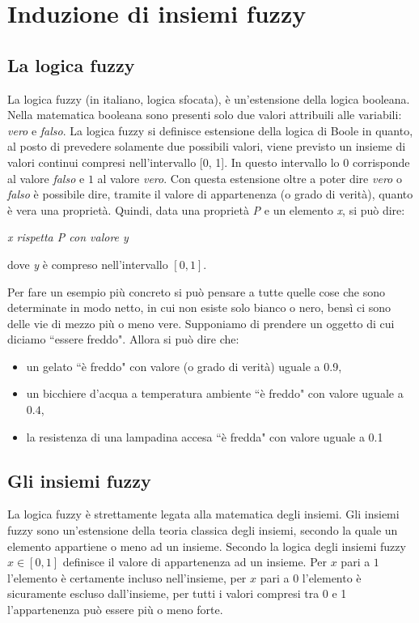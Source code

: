 \documentclass[12pt,italian]{report}
\begin{document}
\chapter{Induzione di insiemi fuzzy}
\label{ch:prova}

\section{La logica fuzzy}
La logica fuzzy (in italiano, logica sfocata), è un'estensione della logica booleana. Nella matematica booleana sono presenti solo due valori attribuili alle variabili: \emph{vero} e \emph{falso}. 
La logica fuzzy si definisce estensione della logica di Boole in quanto, al posto di prevedere solamente due possibili valori, viene previsto un insieme di valori continui compresi nell'intervallo [0, 1]. In questo intervallo lo $0$ corrisponde al valore \emph{falso} e $1$ al valore \emph{vero}. Con questa estensione oltre a poter dire \emph{vero} o \emph{falso} è possibile dire, tramite il valore di appartenenza (o grado di verità), quanto è vera una proprietà.
Quindi, data una proprietà \emph{P} e un elemento \emph{x}, si può dire:

\begin{center}
	\centering
	{

		\em{x rispetta P con valore y}
		
	}
\end{center} 
dove \emph{y} è compreso nell'intervallo $ [0,1] $.

Per fare un esempio più concreto si può pensare a tutte quelle cose che sono determinate in modo netto, in cui non esiste solo bianco o nero, bensì ci sono delle vie di mezzo più o meno vere.
Supponiamo di prendere un oggetto di cui diciamo ``essere freddo". Allora si può dire che:
\begin{itemize}
	\item un gelato ``è freddo" con valore (o grado di verità) uguale a 0.9,
	\item un bicchiere d'acqua a temperatura ambiente ``è freddo" con valore uguale a $ 0.4 $,
	\item la resistenza di una lampadina accesa ``è fredda" con valore uguale a 0.1
\end{itemize}


\section{Gli insiemi fuzzy}
La logica fuzzy è strettamente legata alla matematica degli insiemi. Gli insiemi fuzzy sono un'estensione della teoria classica degli insiemi, secondo la quale un elemento appartiene o meno ad un insieme. %
Secondo la logica degli insiemi fuzzy $x \in [0,1]$ definisce il valore di appartenenza ad un insieme. Per $ x $ pari a $ 1 $ l'elemento è certamente incluso nell'insieme, per $ x $ pari a $ 0 $ l'elemento è sicuramente escluso dall'insieme, per tutti i valori compresi tra 0 e 1 l'appartenenza può essere più o meno forte.
\end{document}

